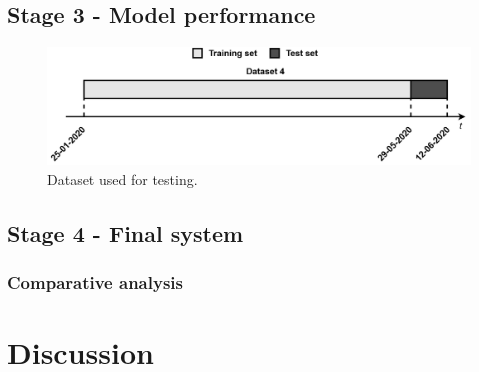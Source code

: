 \subsection{Stage 3 - Model performance}

\begin{figure}[h!]
    \centering
    \begin{center}
    \includegraphics[width=1\textwidth]{Images/Test.png}
    \caption{Dataset used for testing.}
    \label{test}
    \end{center}
\end{figure}


\subsection{Stage 4 - Final system}
\subsubsection{Comparative analysis}

\section{Discussion}

